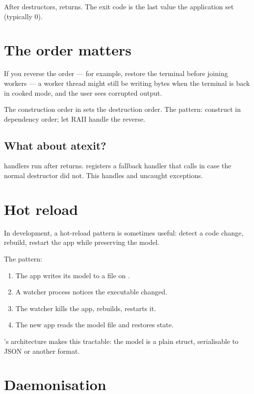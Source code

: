 After destructors,  returns. The exit code is the
last value the application set (typically 0).

\section{The order matters}

If you reverse the order ---  for example, restore the terminal
before joining workers --- a worker thread might still be
writing bytes when the terminal is back in cooked mode, and the
user sees corrupted output.

The construction order in  sets the destruction
order. The pattern: construct in dependency order; let RAII
handle the reverse.

\subsection*{What about atexit?}

 handlers run after  returns. \maya{}
registers a fallback handler that calls 
in case the normal destructor did not. This handles
 and uncaught exceptions.

\section{Hot reload}

In development, a hot-reload pattern is sometimes useful: detect
a code change, rebuild, restart the app while preserving the
model.

The pattern:

\begin{enumerate}[leftmargin=*]
  \item The app writes its model to a file on .
  \item A watcher process notices the executable changed.
  \item The watcher kills the app, rebuilds, restarts it.
  \item The new app reads the model file and restores state.
\end{enumerate}

\maya{}'s architecture makes this tractable: the model is a
plain struct, serialisable to JSON or another format.

\section{Daemonisation}

